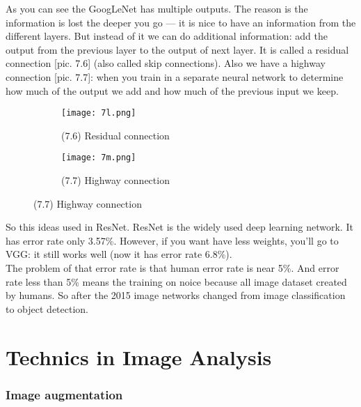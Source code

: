 As you can see the GoogLeNet has multiple outputs. The reason is the information is lost the deeper you go --- it is nice to have an information from the different layers. But instead of it we can do additional information: add the output from the previous layer to the output of next layer. It is called a residual connection [pic. 7.6] (also called skip connections). Also we have a highway connection [pic. 7.7]: when you train in a separate neural network to determine how much of the output we add and how much of the previous input we keep.\\
\begin{figure}[h]
  \centering
  \begin{subfigure}[l]{0.31\linewidth}
    \texttt{[image: 7l.png]}
    \caption*{(7.6) Residual connection}
  \end{subfigure}
  \hspace{2cm}
  \begin{subfigure}[r]{0.4\linewidth}
    \texttt{[image: 7m.png]}
    \caption*{(7.7) Highway connection}
  \end{subfigure}
\end{figure}
So this ideas used in ResNet. ResNet is the widely used deep learning network. It has error rate only 3.57\%. However, if you want have less weights, you'll go to VGG: it still works well (now it has error rate 6.8\%).\\
The problem of that error rate is that human error rate is near 5\%. And error rate less than 5\% means the training on noice because all image dataset created by humans. So after the 2015 image networks changed from image classification to object detection.

\section{Technics in Image Analysis}
\vspace{-0.6cm}
\subsubsection*{Image augmentation}

